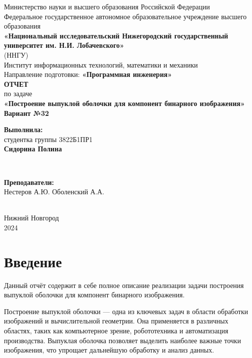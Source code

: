 \documentclass[12pt]{article}
\begin{document}
\begin{titlepage}
    \centering
    \large
    Министерство науки и высшего образования Российской Федерации\\[0.5cm]
    Федеральное государственное автономное образовательное учреждение высшего образования\\[0.5cm]
    \textbf{«Национальный исследовательский Нижегородский государственный университет им. Н.И. Лобачевского»}\\
    (ННГУ)\\[1cm]
    Институт информационных технологий, математики и механики\\[0.5cm]
    Направление подготовки: \textbf{«Программная инженерия»}\\[1cm]

    \vfill %
    {\LARGE \textbf{ОТЧЕТ}}\\[0.5cm]
    {\Large по задаче}\\[0.5cm]
    {\LARGE \textbf{«Построение выпуклой оболочки для компонент бинарного изображения»}}\\[0.5cm]
    {\Large \textbf{Вариант №32}}\\[2.5cm]

    \hfill\parbox{0.5\textwidth}{
        \textbf{Выполнила:} \\
        студентка группы 3822Б1ПР1 \\
        \textbf{Сидорина Полина}
    }\\[0.5cm]

    \hfill\parbox{0.5\textwidth}{
        \textbf{Преподаватели:} \\
        Нестеров А.Ю.
        Оболенский А.А.

    }\\[2cm]

    Нижний Новгород\\
    2024
\end{titlepage}

\tableofcontents
\newpage

\section*{Введение}

Данный отчёт содержит в себе полное описание реализации задачи построения выпуклой оболочки для компонент бинарного изображения.

Построение выпуклой оболочки — одна из ключевых задач в области обработки изображений и вычислительной геометрии. Она применяется в различных областях, таких как компьютерное зрение, робототехника и автоматизация производства. Выпуклая оболочка позволяет выделить наиболее важные точки изображения, что упрощает дальнейшую обработку и анализ данных.
\end{document}
